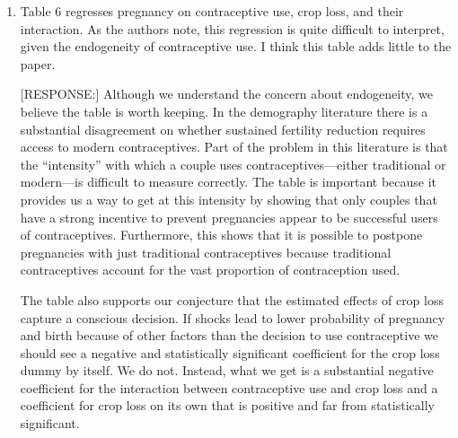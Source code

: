 \documentclass[letterpaper,12pt]{article}
\begin{document}
\begin{enumerate}
[RESPONSE:] The 0.000 coefficients were predominantly for variables
involving initial assets. 
We have changed the variable definition for assets, so that it is
now measured in 1,000,000 TZS. 

Note that there are still a few places---mainly for estimations
involving the use of modern contraceptives---where the estimated 
coefficients are so small that presenting additional digits does not make
much economic sense.
In those cases the standard errors are always equal to or larger than
the coefficients.
See, for example, Table A-10 on the effects of log crop loss.


\item Table 6 regresses pregnancy on contraceptive use, crop loss, and
their interaction. As the authors note, this regression is quite
difficult to interpret, given the endogeneity of contraceptive use. I
think this table adds little to the paper.

[RESPONSE:] Although we understand the concern about endogeneity, 
we believe the table is worth keeping. 
In the demography literature there is a substantial disagreement on whether
sustained fertility reduction requires access to modern contraceptives.
Part of the problem in this literature is that the ``intensity'' with
which a couple uses contraceptives---either traditional or modern---is
difficult to measure correctly.
The table is important because it provides us a way to get at this
intensity by showing that only couples that have a strong incentive to
prevent pregnancies appear to be successful users of contraceptives.
Furthermore, this shows that it is possible to postpone pregnancies with
just traditional contraceptives because traditional contraceptives account 
for the vast proportion of contraception used.

The table also supports our conjecture that the estimated effects 
of crop loss capture a conscious decision. 
If shocks lead to lower probability of pregnancy and birth because
of other factors than the decision to use contraceptive we should see
a negative and statistically significant coefficient for the crop loss
dummy by itself.
We do not.
Instead, what we get is a substantial negative coefficient for the interaction
between contraceptive use and crop loss and a coefficient for crop loss 
on its own that is positive and far from statistically significant.



\end{enumerate}
\end{document}
